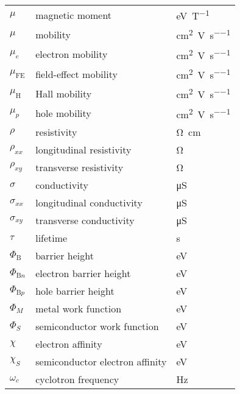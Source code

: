 \begin{longtable}[l]{p{125pt} p{150pt} p{150pt}}
	$\mu$ & magnetic moment & \si{\electronvolt\per\tesla}\\
	$\mu$ & mobility & \si{\cm\squared\per\volt\per\second}\\
	$\mu_e$ & electron mobility & \si{\cm\squared\per\volt\per\second}\\
	$\mu_\mathrm{FE}$ & field-effect mobility & \si{\cm\squared\per\volt\per\second}\\
	$\mu_\mathrm{H}$ & Hall mobility & \si{\cm\squared\per\volt\per\second}\\
	$\mu_p$ & hole mobility & \si{\cm\squared\per\volt\per\second}\\
	$\rho$ & resistivity & \si{\ohm\cm}\\
	$\rho_{xx}$ & longitudinal resistivity & \si{\ohm}\\
	$\rho_{xy}$ & transverse resistivity & \si{\ohm}\\
	$\sigma$ & conductivity & \si{\micro\siemens} \\
	$\sigma_{xx}$ & longitudinal conductivity & \si{\micro\siemens}\\
	$\sigma_{xy}$ & transverse conductivity & \si{\micro\siemens}\\
	$\tau$ & lifetime & \si{\second}\\
	$\Phi_\mathrm{B}$ & barrier height & \si{\electronvolt}\\
	$\Phi_{\mathrm{B}n}$ & electron barrier height & \si{\electronvolt}\\
	$\Phi_{\mathrm{B}p}$ & hole barrier height & \si{\electronvolt}\\
	$\Phi_M$ & metal work function & \si{\electronvolt}\\
	$\Phi_S$ & semiconductor work function & \si{\electronvolt}\\
	$\chi$ & electron affinity & \si{\electronvolt}\\
	$\chi_S$ & semiconductor electron affinity & \si{\electronvolt}\\
	$\omega_{c}$ & cyclotron frequency & \si{\hertz}\\
\bottomrule
\end{longtable}


%
